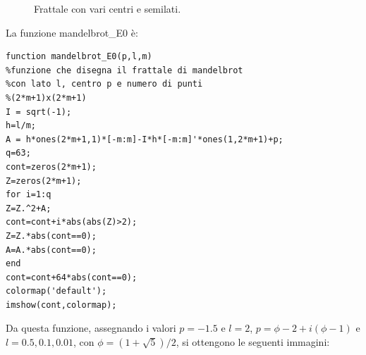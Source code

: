\documentclass[11pt,a4paper,twoside,openright,titlepage,
headinclude,footinclude,BCOR5mm,
numbers=noenddot,cleardoublepage=empty,
tablecaptionabove]{scrbook}
\begin{document}
\begin{figure}[h!]
\caption{Frattale con vari centri e semilati.}
\end{figure}
\newpage
La funzione mandelbrot\_E0 è:
\begin{lstlisting}[frame=trBL]
function mandelbrot_E0(p,l,m)
%funzione che disegna il frattale di mandelbrot
%con lato l, centro p e numero di punti
%(2*m+1)x(2*m+1)
I = sqrt(-1);
h=l/m;
A = h*ones(2*m+1,1)*[-m:m]-I*h*[-m:m]'*ones(1,2*m+1)+p;
q=63;
cont=zeros(2*m+1);
Z=zeros(2*m+1);
for i=1:q
Z=Z.^2+A;
cont=cont+i*abs(abs(Z)>2);
Z=Z.*abs(cont==0);
A=A.*abs(cont==0);
end
cont=cont+64*abs(cont==0);
colormap('default');
imshow(cont,colormap);
\end{lstlisting}
Da questa funzione, assegnando i valori $p=-1.5$ e $l=2$, 
$p=\phi-2+i(\phi-1)$ e $l=0.5, 0.1, 0.01$, con $\phi=(1+\sqrt{5})/2$, 
si ottengono le seguenti immagini:
\end{document}

